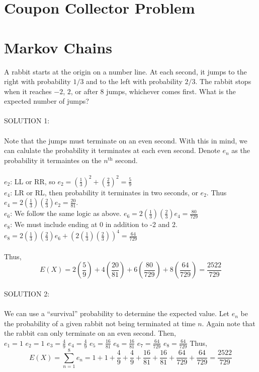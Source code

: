 \documentclass[12pt]{book}
\begin{document}
\section{Coupon Collector Problem}

\section{Markov Chains}

\begin{propc}
    A rabbit starts at the origin on a number line. At each second, it jumps to the right with probability $1/3$ and to the left with probability $2/3$. The rabbit stops when it reaches $-2$, $2$, or after $8$ jumps, whichever comes first. What is the expected number of jumps? \\\\
    SOLUTION 1: \\\\
Note that the jumps must terminate on an even second. With this in mind, we can calulate the probability it terminates at each even second. Denote $e_n$ as the probability it termaintes on the $n^{\text{th}}$ second. \\\\
$e_2$: LL or RR, so $e_2={\left(\frac{1}{3}\right)}^2+{\left(\frac{2}{3}\right)}^2=\frac{5}{9}$ \\
$e_4$: LR or RL, then probability it terminates in two seconds, or $e_2$. Thus $e_4=2{\left(\frac{1}{3}\right)}{\left(\frac{2}{3}\right)}e_2=\frac{20}{81}$.\\
$e_6$: We follow the same logic as above. $e_6=2{\left(\frac{1}{3}\right)}{\left(\frac{2}{3}\right)}e_4=\frac{80}{729}$\\
$e_8$: We must include ending at 0 in addition to -2 and 2. \\ $e_8=2{\left(\frac{1}{3}\right)}{\left(\frac{2}{3}\right)}e_6+{\left(2{\left(\frac{1}{3}\right)}{\left(\frac{2}{3}\right)}\right)}^4=\frac{64}{729}$\\\\
Thus, \[E(X)=2\left(\frac{5}{9}\right)+4\left(\frac{20}{81}\right)+6\left(\frac{80}{729}\right)+8\left(\frac{64}{729}\right)=\boxed{\frac{2522}{729}}\]\\

\noindent SOLUTION 2: \\\\

We can use a ``survival'' probability to determine the expected value. Let $e_n$ be the probability of a given rabbit not being terminated at time $n$. Again note that the rabbit can only terminate on an even second. Then, \\
$e_1=1$
$e_2=1$
$e_3=\frac{4}{9}$
$e_4=\frac{4}{9}$
$e_5=\frac{16}{81}$
$e_6=\frac{16}{81}$
$e_7=\frac{64}{729}$
$e_8=\frac{64}{729}$
Thus,
\[E(X)=\sum_{n=1}^{8}e_n=1+1+\frac{4}{9}+\frac{4}{9}+\frac{16}{81}+\frac{16}{81}+\frac{64}{729}+\frac{64}{729}=\boxed{\frac{2522}{729}}\]

\end{propc}
\end{document}
